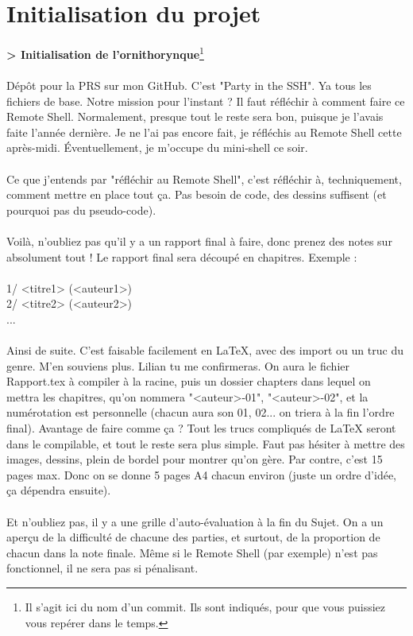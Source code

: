 \chapter[Initialisation]{Initialisation du projet}
\textbf{> Initialisation de l'ornithorynque}\footnote{Il s'agit ici du nom d'un commit. Ils sont indiqués, pour que vous puissiez vous repérer dans le temps.}
\\\\
Dépôt pour la PRS sur mon GitHub. C'est "Party in the SSH". Ya tous les fichiers de base. Notre mission pour l'instant ? Il faut réfléchir à comment faire ce Remote Shell.
Normalement, presque tout le reste sera bon, puisque je l'avais faite l'année dernière. Je ne l'ai pas encore fait, je réfléchis au Remote Shell cette après-midi. Éventuellement, je m'occupe du mini-shell ce soir.
\\\\
Ce que j'entends par "réfléchir au Remote Shell", c'est réfléchir à, techniquement, comment mettre en place tout ça. Pas besoin de code, des dessins suffisent (et pourquoi pas du pseudo-code).
\\\\
Voilà, n'oubliez pas qu'il y a un rapport final à faire, donc prenez des notes sur absolument tout ! Le rapport final sera découpé en chapitres. Exemple :
\\\\
1/ <titre1> (<auteur1>)
\\2/ <titre2> (<auteur2>)
\\...
\\\\
Ainsi de suite. C'est faisable facilement en LaTeX, avec des import ou un truc du genre. M'en souviens plus. Lilian tu me confirmeras. On aura le fichier Rapport.tex à compiler à la racine, puis un dossier chapters dans lequel on mettra les chapitres, qu'on nommera "<auteur>-01", "<auteur>-02", et la numérotation est personnelle (chacun aura son 01, 02... on triera à la fin l'ordre final). Avantage de faire comme ça ? Tout les trucs compliqués de LaTeX seront dans le compilable, et tout le reste sera plus simple. Faut pas hésiter à mettre des images, dessins, plein de bordel pour montrer qu'on gère. Par contre, c'est 15 pages max. Donc on se donne 5 pages A4 chacun environ (juste un ordre d'idée, ça dépendra ensuite).
\\\\
Et n'oubliez pas, il y a une grille d'auto-évaluation à la fin du Sujet. On a un aperçu de la difficulté de chacune des parties, et surtout, de la proportion de chacun dans la note finale. Même si le Remote Shell (par exemple) n'est pas fonctionnel, il ne sera pas si pénalisant.